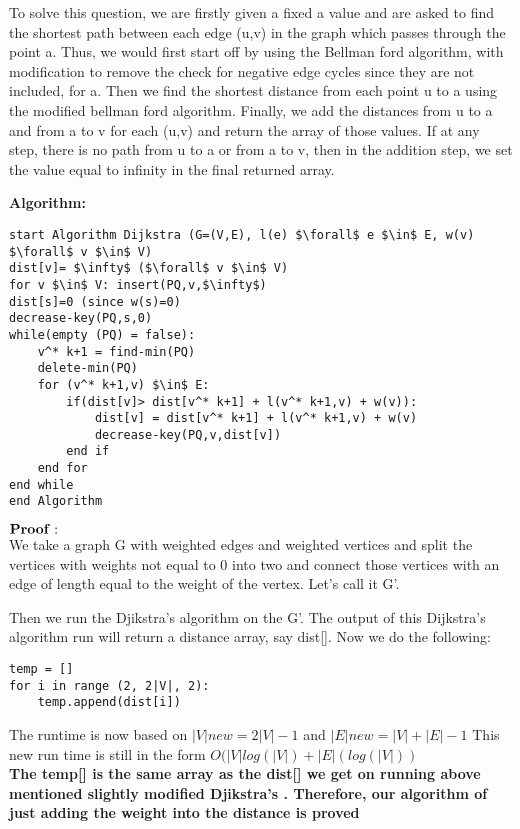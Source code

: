 \documentclass[letterpaper,11pt]{article}
\newcounter{problemid}\stepcounter{problemid}
\def\newproblem{\vspace*{0.5cm}{\bf Problem~\arabic{problemid}\stepcounter{problemid}}\hfill\fbox{\parbox{0.16\textwidth}{\bf Points:}}\par}
\begin{document}
To solve this question, we are firstly given a fixed a value and are asked to find the shortest path between each edge (u,v) in the graph which passes through the point a. Thus, we would first start off by using the Bellman ford algorithm, with modification to remove the check for negative edge cycles since they are not included, for a. Then we find the shortest distance from each point u to a using the modified bellman ford algorithm. Finally, we add the distances from u to a and from a to v for each (u,v) and return the array of those values. If at any step, there is no path from u to a or from a to v, then in the addition step, we set the value equal to infinity in the final returned array.


\newproblem

{\bf Algorithm: }
\begin{Verbatim}[commandchars=\\\{\},codes={\catcode`$=3\catcode`_=8}]
start Algorithm Dijkstra (G=(V,E), l(e) $\forall$ e $\in$ E, w(v) $\forall$ v $\in$ V)
dist[v]= $\infty$ ($\forall$ v $\in$ V)
for v $\in$ V: insert(PQ,v,$\infty$)
dist[s]=0 (since w(s)=0)
decrease-key(PQ,s,0)
while(empty (PQ) = false):
    v^* k+1 = find-min(PQ)
    delete-min(PQ)
    for (v^* k+1,v) $\in$ E:
        if(dist[v]> dist[v^* k+1] + l(v^* k+1,v) + w(v)):
            dist[v] = dist[v^* k+1] + l(v^* k+1,v) + w(v)
            decrease-key(PQ,v,dist[v])
        end if
    end for
end while
end Algorithm

\end{Verbatim}
$\bf Proof:$\\
We take a graph G with weighted edges and weighted vertices and split the vertices with weights not equal to 0 into two and connect those vertices with an edge of length equal to the weight of the vertex. Let's call it G'. 

Then we run the Djikstra's algorithm on the G'. The output of this Dijkstra's algorithm run will return a distance array, say dist[]. Now we do the following:
\begin{Verbatim}[commandchars=\\\{\},codes={\catcode`$=3\catcode`_=8}]
temp = []
for i in range (2, 2|V|, 2):
    temp.append(dist[i])
\end{Verbatim}

The runtime is now based on $|V|new = 2|V|-1 $ and $|E|new = |V|+|E|-1$ This new run time is still in the form $O(|V|log(|V|) + |E|(log(|V|))$\\

{\bf The temp[] is the same array as the dist[] we get on running above mentioned slightly modified Djikstra's . Therefore, our algorithm of just adding the weight into the distance is proved}
\end{document}
